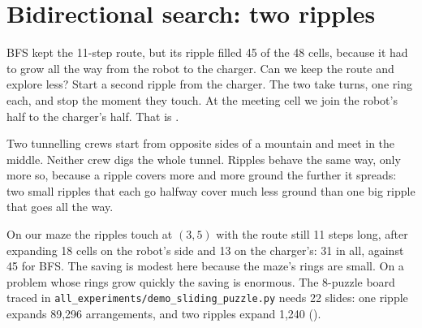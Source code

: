 \section{Bidirectional search: two ripples}

BFS kept the 11-step route, but its ripple filled 45 of the 48 cells, because it had to grow all the way from the robot to the charger. Can we keep the route and explore less? Start a second ripple from the charger. The two take turns, one ring each, and stop the moment they touch. At the meeting cell we join the robot's half to the charger's half. That is .

\begin{analogy}
Two tunnelling crews start from opposite sides of a mountain and meet in the middle. Neither crew digs the whole tunnel. Ripples behave the same way, only more so, because a ripple covers more and more ground the further it spreads: two small ripples that each go halfway cover much less ground than one big ripple that goes all the way.
\end{analogy}

On our maze the ripples touch at $(3,5)$ with the route still 11 steps long, after expanding 18 cells on the robot's side and 13 on the charger's: 31 in all, against 45 for BFS. The saving is modest here because the maze's rings are small. On a problem whose rings grow quickly the saving is enormous. The 8-puzzle board traced in \texttt{all\_experiments/demo\_sliding\_puzzle.py} needs 22 slides: one ripple expands 89,296 arrangements, and two ripples expand 1,240 ().

